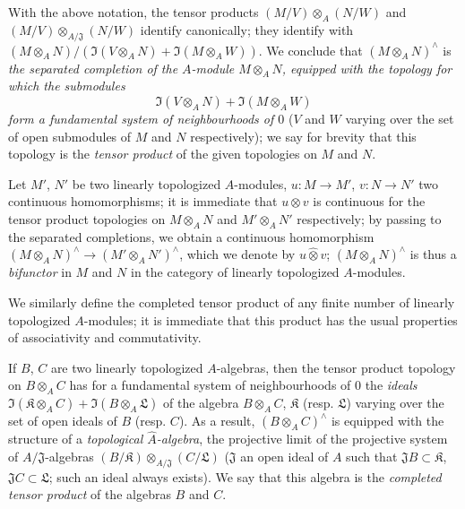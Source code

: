 \begin{env}[7.7.2]
\label{0.7.7.2}
With the above notation, the tensor products $(M/V)\otimes_A(N/W)$ and
$(M/V)\otimes_{A/\mathfrak{J}}(N/W)$ identify canonically; they identify with
$(M\otimes_A N)/(\Im(V\otimes_A N)+\Im(M\otimes_A W))$. We conclude that $(M\otimes_A N)^\wedge$
is \emph{the separated completion of the $A$-module $M\otimes_A N$, equipped with the topology for
which the submodules
\[
  \Im(V\otimes_A N)+\Im(M\otimes_A W)
\]
form a fundamental system of neighbourhoods of $0$} ($V$ and $W$ varying over the set of open submodules
of $M$ and $N$ respectively); we say for brevity that this topology is the \emph{tensor product} of
the given topologies on $M$ and $N$.
\end{env}

\begin{env}[7.7.3]
\label{0.7.7.3}
Let $M'$, $N'$ be two linearly topologized $A$-modules, $u:M\to M'$, $v:N\to N'$ two continuous
homomorphisms; it is immediate that $u\otimes v$ is continuous for the tensor product topologies on
$M\otimes_A N$ and $M'\otimes_A N'$ respectively; by passing to the separated completions, we obtain
a continuous homomorphism $(M\otimes_A N)^\wedge\to(M'\otimes_A N')^\wedge$, which we denote by
$u\widehat{\otimes}v$; $(M\otimes_A N)^\wedge$ is thus a \emph{bifunctor} in $M$ and $N$ in the category
of linearly topologized $A$-modules.
\end{env}

\begin{env}[7.7.4]
\label{0.7.7.4}
We similarly define the completed tensor product of any finite number of linearly topologized
$A$-modules; it is immediate that this product has the usual properties of associativity and
commutativity.
\end{env}

\begin{env}[7.7.5]
\label{0.7.7.5}
If $B$, $C$ are two linearly topologized $A$-algebras, then the tensor product topology on
$B\otimes_A C$ has for a fundamental system of neighbourhoods of $0$ the \emph{ideals}
$\Im(\mathfrak{K}\otimes_A C)+\Im(B\otimes_A\mathfrak{L})$ of the algebra $B\otimes_A C$,
$\mathfrak{K}$ (resp. $\mathfrak{L}$) varying over the set of open ideals of $B$ (resp. $C$).
As a result, $(B\otimes_A C)^\wedge$ is equipped with the structure of a \emph{topological
$\widehat{A}$-algebra}, the projective limit of the projective system of $A/\mathfrak{J}$-algebras
$(B/\mathfrak{K})\otimes_{A/\mathfrak{J}}(C/\mathfrak{L})$ ($\mathfrak{J}$ an open ideal of $A$
such that $\mathfrak{J}B\subset\mathfrak{K}$, $\mathfrak{J}C\subset\mathfrak{L}$; such an ideal always exists).
We say that this algebra is the \emph{completed tensor product} of the algebras $B$ and $C$.
\end{env}

